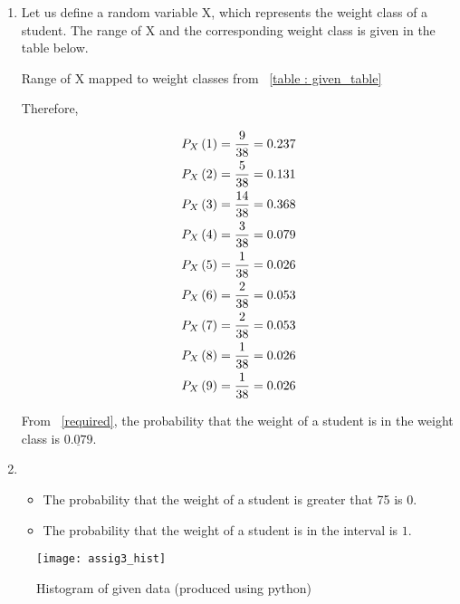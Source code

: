 \documentclass[journal,12pt,twocolumn]{IEEEtran}
\begin{document}
	\begin{enumerate}[label = \brak{\textbf{\roman*}}]
	\item
	
	Let us define a random variable X, which represents the weight class of a student. The range of X and the corresponding weight class is given in the table below.
	
	\begin{table}[h!tb]
	
		\centering
		
		\caption{Range of X mapped to weight classes from ~\ref{table : given_table}}
		
		
		
		\label{table : range_table}
		
	\end{table}
	
	
	Therefore,
	
	\begin{align}
		P_X \left(1\right) &= \frac{9}{38} = 0.237\\
		P_X \left(2\right) &= \frac{5}{38} = 0.131\\
		P_X \left(3\right) &= \frac{14}{38} = 0.368\\
		P_X \left(4\right) &= \frac{3}{38} = 0.079
			\label{required}\\
		P_X \left(5\right) &= \frac{1}{38} = 0.026\\
		P_X \left(6\right) &= \frac{2}{38} = 0.053\\
		P_X \left(7\right) &= \frac{2}{38} = 0.053\\
		P_X \left(8\right) &= \frac{1}{38} = 0.026\\
		P_X \left(9\right) &= \frac{1}{38} = 0.026
	\end{align}
	
	
	From ~\eqref{required}, the probability that the weight of a student is in the weight class  is $\underline{0.079}.$ 
		
	
	\item
	
	\begin{itemize}
	
		\item The probability that the weight of a student is greater that 75 is $0$.
		
		\item The probability that the weight of a student is in the interval  is $1$.
	
	\end{itemize}
	
	\end{enumerate}
	
	\begin{figure}[!htb]
	
		\texttt{[image: assig3\_hist]}
		\caption{Histogram of given data (produced using python)}
		
	\end{figure}
\end{document}

